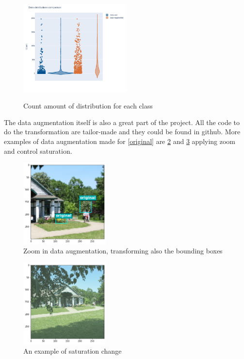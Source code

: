 \documentclass[11pt, a4paper, twocolumn]{article}
\begin{document}
\begin{figure}[!ht]
	\centering
	\includegraphics[width=0.5\textwidth]{data-aug2.png}
	\label{aug2}
	\caption{Count amount of distribution for each class}
\end{figure}

The data augmentation itself is also a great part of the project. All the code to do the transformation are tailor-made and they could be found in github. More examples of data augmentation made for \ref{original} are \ref{aug1plus} and \ref{aug2plus} applying zoom and control saturation.

\begin{figure}[!ht]
	\centering
	\includegraphics[width=0.4\textwidth]{aug-plus1.png}
	\caption{Zoom in data augmentation, transforming also the bounding boxes}
	\label{aug1plus}
\end{figure}

\begin{figure}[!ht]
	\centering
	\includegraphics[width=0.4\textwidth]{aug-plus2.png}
	\caption{An example of saturation change}
	\label{aug2plus}
\end{figure}
\end{document}
